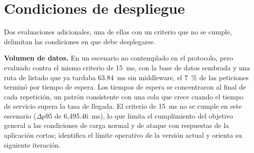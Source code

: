 \section{Condiciones de despliegue}
\label{sec:dis-despliegue}

Dos evaluaciones adicionales, una de ellas con un criterio que no se cumple, delimitan las
condiciones en que debe desplegarse.

\textbf{Volumen de datos.} En un escenario no contemplado en el protocolo, pero evaluado contra el mismo criterio de 15~ms, con la base de datos
sembrada y una ruta de listado que ya tardaba 63.84~ms sin middleware, el 7~\% de las peticiones
terminó por tiempo de espera. Los tiempos de espera se concentraron al final de cada repetición,
un patrón consistente con una cola que crece cuando el tiempo de servicio supera la tasa de
llegada. El criterio de 15~ms no se cumple en este escenario ($\Delta p95$ de 6{,}495.46~ms), lo que
limita el cumplimiento del objetivo general a las condiciones de carga normal y de ataque con
respuestas de la aplicación cortas; identifica el límite operativo de la versión actual y
orienta su siguiente iteración.

